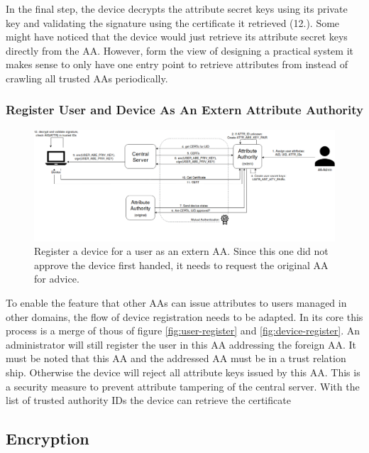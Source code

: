 In the final step, the device decrypts the attribute secret keys using its private key and validating the signature using the certificate it retrieved (12.). Some might have noticed that the device would just retrieve its attribute secret keys directly from the AA. However, form the view of designing a practical system it makes sense to only have one entry point to retrieve attributes from instead of crawling all trusted AAs periodically. 


\subsubsection{Register User and Device As An Extern Attribute Authority}
\begin{figure}[!h]
\centering
    \includegraphics[width=\linewidth]{img/device_register2.png}
    \caption{Register a device for a user as an extern AA. Since this one did not approve the device first handed, it needs to request the original AA for advice.}
    \label{fig:device-register2}
\end{figure}
To enable the feature that other AAs can issue attributes to users managed in other domains, the flow of device registration needs to be adapted.  In its core this process is a merge of thous of figure \ref{fig:user-register} and \ref{fig:device-register}. An administrator will still register the user in this AA addressing the foreign AA. It must be noted that this AA and the addressed AA must be in a trust relation ship. Otherwise the device will reject all attribute keys issued by this AA. This is a security measure to prevent attribute tampering of the central server. With the list of trusted authority IDs the device can retrieve the certificate 


\subsection{Encryption}

